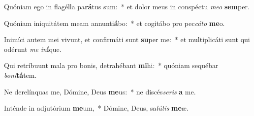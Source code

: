 \item Quóniam ego in flagélla pa\textbf{rá}tus sum:~* et dolor meus in conspéctu \textit{meo} \textbf{sem}per.
\item Quóniam iniquitátem meam annunti\textbf{á}bo:~* et cogitábo pro pec\textit{cáto} \textbf{me}o.
\item Inimíci autem mei vivunt, et confirmáti sunt \textbf{su}per me:~* et multiplicáti sunt qui odérunt \textit{me} \textit{in}\textbf{í}que.
\item Qui retríbuunt mala pro bonis, detrahébant \textbf{mi}hi:~* quóniam sequébar \textit{boni}\textbf{tá}tem.
\item Ne derelínquas me, Dómine, Deus \textbf{me}us:~* ne discés\hspace{0.03em}\textit{seris} \textbf{a} me.
\item Inténde in adjutórium \textbf{me}um,~* Dómine, Deus, sa\textit{lútis} \textbf{me}æ.
